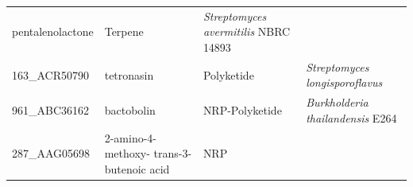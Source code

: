 \documentclass[12pt,twoside]{reedthesis}
\begin{document}
\begin{longtable}[]{@{}llll@{}}
\begin{minipage}[t]{0.20\columnwidth}
  pentalenolactone\strut
  \end{minipage} & \begin{minipage}[t]{0.15\columnwidth}\raggedright\strut
  Terpene\strut
  \end{minipage} & \begin{minipage}[t]{0.34\columnwidth}\raggedright\strut
  \emph{Streptomyces avermitilis} NBRC 14893\strut
  \end{minipage}\tabularnewline
  \begin{minipage}[t]{0.19\columnwidth}\raggedright\strut
  163\_ACR50790\strut
  \end{minipage} & \begin{minipage}[t]{0.20\columnwidth}\raggedright\strut
  tetronasin\strut
  \end{minipage} & \begin{minipage}[t]{0.15\columnwidth}\raggedright\strut
  Polyketide\strut
  \end{minipage} & \begin{minipage}[t]{0.34\columnwidth}\raggedright\strut
  \emph{Streptomyces longisporoflavus}\strut
  \end{minipage}\tabularnewline
  \begin{minipage}[t]{0.19\columnwidth}\raggedright\strut
  961\_ABC36162\strut
  \end{minipage} & \begin{minipage}[t]{0.20\columnwidth}\raggedright\strut
  bactobolin\strut
  \end{minipage} & \begin{minipage}[t]{0.15\columnwidth}\raggedright\strut
  NRP-Polyketide\strut
  \end{minipage} & \begin{minipage}[t]{0.34\columnwidth}\raggedright\strut
  \emph{Burkholderia thailandensis} E264\strut
  \end{minipage}\tabularnewline
  \begin{minipage}[t]{0.19\columnwidth}\raggedright\strut
  287\_AAG05698\strut
  \end{minipage} & \begin{minipage}[t]{0.20\columnwidth}\raggedright\strut
  2-amino-4-methoxy- trans-3- butenoic acid\strut
  \end{minipage} & \begin{minipage}[t]{0.15\columnwidth}\raggedright\strut
  NRP\strut
  \end{minipage} & \begin{minipage}[t]{0.34\columnwidth}\raggedright\strut

\end{minipage}
\end{longtable}
\end{document}
